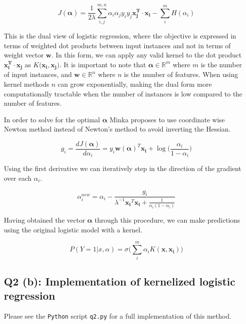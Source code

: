 \documentclass[11pt]{amsart}
\newcommand{\vek}[1]{\mathbf{#1}}
\begin{document}
\begin{equation}
J(\vek{\alpha}) = \frac{1}{2\lambda}\sum_{i,j}^{m,n}\alpha_{i}\alpha_{j}y_{i}y_{j}\vek{x_{j}^{T}\cdot x_{i}} - \sum_{i}^{m}H(\alpha_i)
\end{equation}

This is the dual view of logistic regression, where the objective is expressed in terms of weighted dot products between input instances and not in terms of weight vector $\vek{w}$. In this form, we can apply any valid kernel to the dot product $\vek{x_i^T\cdot x_j}$ as $K(\vek{x_i, x_j)}$. It is important to note that $\vek{\alpha} \in \mathbb{R}^m$ where $m$ is the number of input instances, and $\vek{w} \in \mathbb{R}^n$ where $n$ is the number of features. When using kernel methods $n$ can grow exponentially, making the dual form more computationally tractable when the number of instances is low compared to the number of features. 

In order to solve for the optimal $\vek{\alpha}$ Minka proposes to use coordinate wise Newton method instead of Newton's method to avoid inverting the Hessian. 

\begin{equation}
g_i = \frac{dJ(\vek{\alpha})}{d\alpha_i} = y_i\vek{w(\alpha)}^T \vek{x_i} + \log \bigg(\frac{\alpha_i}{1-\alpha_i}\bigg)
\end{equation}

Using the first derivative we can iteratively step in the direction of the gradient over each $\alpha_i$.

\begin{equation}
\alpha_i^{new} = \alpha_i - \frac{g_i}{\lambda^{-1}\vek{x_i}^T\vek{x_i} + \frac{1}{\alpha_i(1-\alpha_i)}}
\end{equation}

Having obtained the vector $\vek{\alpha}$ through this procedure, we can make predictions using the original logistic model with a kernel.

\begin{equation}
P(Y=1 \vert x, \alpha) = \sigma\bigg(\sum_i^{m} \alpha_i K(\vek{x}, \vek{x_i})\bigg)
\end{equation}


\subsection{Q2 (b): Implementation of kernelized logistic regression}

Please see the \texttt{Python} script \texttt{q2.py} for a full implementation of this method.
\end{document}
